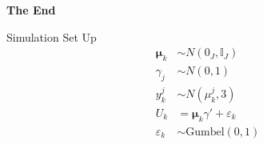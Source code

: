 \documentclass[aspectratio=169,xcolor=dvipsnames]{beamer}
\begin{document}
\begin{frame}
    \Huge{\centerline{\textbf{The End}}}
\end{frame}


\begin{frame}[label=sim-setup]{Simulation Set Up} %
\begin{align*}
    \bm{\mu}_k &\sim N(0_J, \mathbb{I}_J) \\
    \gamma_j  &\sim N(0, 1) \\
    y_{k}^j &\sim N(\mu_k^j , 3) \\
    U_k &= \bm{\mu}_k \gamma' + \varepsilon_k \\
    \varepsilon_k &\sim \text{Gumbel}(0,1)
\end{align*}
    \hyperlink{sims}{}
\end{frame}
\end{document}
